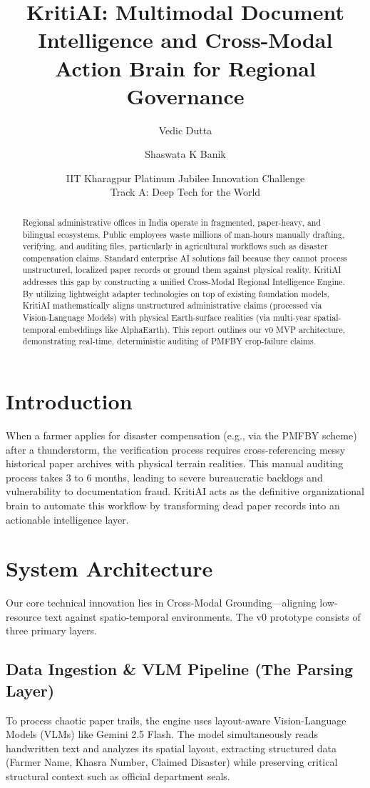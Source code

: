 \documentclass[12pt, a4paper]{article}
\title{\textbf{KritiAI: Multimodal Document Intelligence and Cross-Modal Action Brain for Regional Governance}}
\author{Vedic Dutta \and Shaswata K Banik}
\date{IIT Kharagpur Platinum Jubilee Innovation Challenge\\Track A: Deep Tech for the World}
\begin{document}
\maketitle

\begin{abstract}
Regional administrative offices in India operate in fragmented, paper-heavy, and bilingual ecosystems. Public employees waste millions of man-hours manually drafting, verifying, and auditing files, particularly in agricultural workflows such as disaster compensation claims. Standard enterprise AI solutions fail because they cannot process unstructured, localized paper records or ground them against physical reality. KritiAI addresses this gap by constructing a unified Cross-Modal Regional Intelligence Engine. By utilizing lightweight adapter technologies on top of existing foundation models, KritiAI mathematically aligns unstructured administrative claims (processed via Vision-Language Models) with physical Earth-surface realities (via multi-year spatial-temporal embeddings like AlphaEarth). This report outlines our v0 MVP architecture, demonstrating real-time, deterministic auditing of PMFBY crop-failure claims.
\end{abstract}

\section{Introduction}
When a farmer applies for disaster compensation (e.g., via the PMFBY scheme) after a thunderstorm, the verification process requires cross-referencing messy historical paper archives with physical terrain realities. This manual auditing process takes 3 to 6 months, leading to severe bureaucratic backlogs and vulnerability to documentation fraud. KritiAI acts as the definitive organizational brain to automate this workflow by transforming dead paper records into an actionable intelligence layer.

\section{System Architecture}
Our core technical innovation lies in Cross-Modal Grounding—aligning low-resource text against spatio-temporal environments. The v0 prototype consists of three primary layers.

\subsection{Data Ingestion \& VLM Pipeline (The Parsing Layer)}
To process chaotic paper trails, the engine uses layout-aware Vision-Language Models (VLMs) like Gemini 2.5 Flash. The model simultaneously reads handwritten text and analyzes its spatial layout, extracting structured data (Farmer Name, Khasra Number, Claimed Disaster) while preserving critical structural context such as official department seals.
\end{document}
